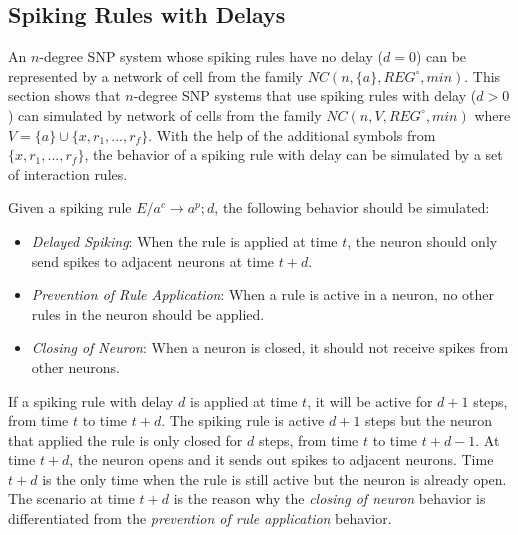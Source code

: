 \documentclass[a4paper]{article}
\theoremstyle{definition}
\newcommand{\ra}{\rightarrow}
\begin{document}

\subsection{Spiking Rules with Delays}

An $n$-degree SNP system whose spiking rules have no delay ($d =0$) can be represented by a network 
of cell from the family $NC(n,\{a\}, REG^{\circ}, min)$. This section shows that $n$-degree SNP 
systems that use spiking rules with delay ($d > 0$) can simulated by network of cells from the 
family $NC(n, V, REG^{\circ}, min)$ where $V = \{a\} \cup \{x,r_1,...,r_f\}$. With the help of the
additional symbols from $\{x,r_1,...,r_f\}$, the behavior of a spiking rule with delay can be 
simulated by a set of interaction rules. 

Given a spiking rule $E/a^c \ra a^p;d$, the following behavior should be simulated:
\begin{itemize}
\item \emph{Delayed Spiking}: When the rule is applied at time $t$, the neuron should only send
      spikes to adjacent neurons at time $t+d$.
\item \emph{Prevention of Rule Application}: When a rule is active in a neuron, no other rules in 
      the neuron should be applied. 
\item \emph{Closing of Neuron}: When a neuron is closed, it should not receive spikes from other 
      neurons.
\end{itemize}

If a spiking rule with delay $d$ is applied at time $t$, it will be active for $d+1$ steps, from 
time $t$ to time $t+d$. The spiking rule is active $d+1$ steps but the neuron that applied the rule 
is only closed for $d$ steps, from time $t$ to time $t+d-1$. At time $t+d$, the neuron opens and it
sends out spikes to adjacent neurons. Time $t+d$ is the only time when the rule is still active 
but the neuron is already open. The scenario at time $t+d$ is the reason why the \emph{closing of
neuron} behavior is differentiated from the \emph{prevention of rule application} behavior.
\end{document}
